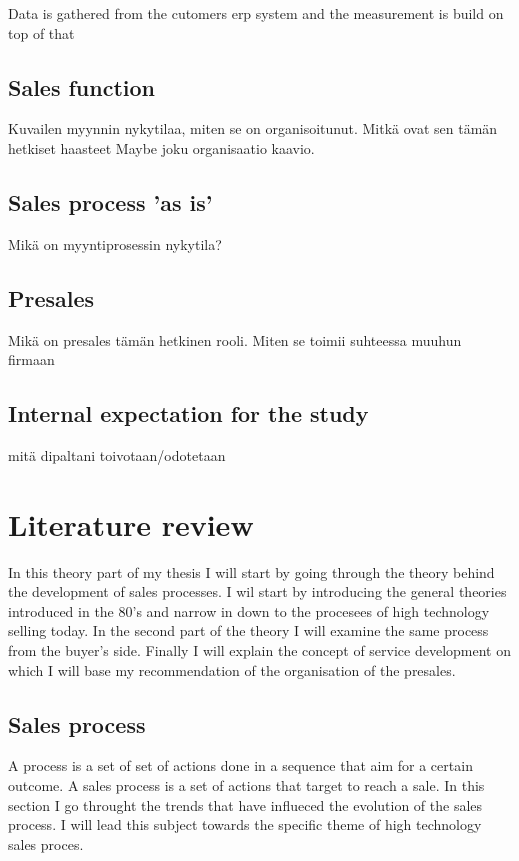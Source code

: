 \documentclass[12pt,a4paper,oneside,pdftex]{report}
\begin{document}
Data is gathered from the cutomers erp system and the measurement is build on top of that 


\section{Sales function}

Kuvailen myynnin nykytilaa, miten se on organisoitunut. Mitkä ovat sen tämän hetkiset haasteet
Maybe joku organisaatio kaavio. 


\section{Sales process 'as is'}

Mikä on myyntiprosessin nykytila?

\section{Presales}

Mikä on presales tämän hetkinen rooli. Miten se toimii suhteessa muuhun firmaan

\section{Internal expectation for the study}

mitä dipaltani toivotaan/odotetaan

% 

\chapter{Literature review}
\label{chapter:Theory}


In this theory part of my thesis I will start by going through the theory behind the development of sales processes. I wil start by introducing the general theories introduced in the 80's and narrow in down to the procesees of high technology selling today. 
In the second part of the theory I will examine the same process from the buyer's side. 
Finally I will explain the concept of service development on which I will base my recommendation of the organisation of the presales. 


\section{Sales process}
\label{sec:environments}
A process is a set of set of actions done in a sequence that aim for a certain outcome. A sales process is a set of actions that target to reach a sale. In this section I go throught the trends that have influeced the evolution of the sales process. I will lead this subject towards the specific theme of high technology sales proces.  
\end{document}
